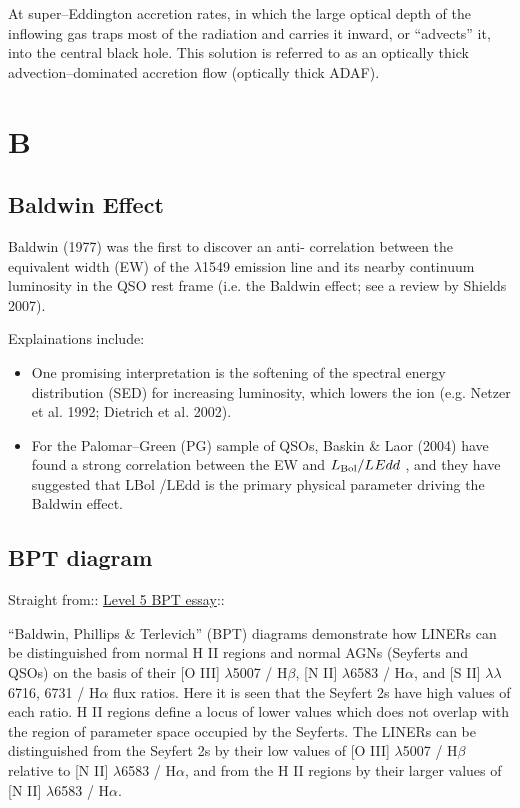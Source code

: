 \documentclass[11pt]{article}
\begin{document}
At super–Eddington accretion rates, in which the large optical depth
of the inflowing gas traps most of the radiation and carries it
inward, or “advects” it, into the central black hole. This solution is
referred to as an optically thick advection–dominated accretion flow
(optically thick ADAF).

\section*{B}

\subsection*{Baldwin Effect}
Baldwin (1977) was the first to discover an anti- correlation between the equivalent width (EW) of the \civ $\lambda$1549 emission line and its nearby continuum luminosity in the QSO rest frame (i.e. the Baldwin effect; see a review by Shields 2007). 

Explainations include:
\begin{itemize}

\item One promising interpretation is the softening of the spectral energy distribution (SED) for increasing luminosity, which lowers the ion (e.g. Netzer et al. 1992; Dietrich et al. 2002).

\item For the Palomar–Green (PG) sample of QSOs, Baskin \& Laor (2004) have found a strong correlation between the \civ EW and $L_{\rm Bol} /L_{\rm} Edd$ , and they have suggested that LBol /LEdd is the primary physical parameter driving the Baldwin effect. 

\end{itemize}



\subsection*{BPT diagram}
Straight from:: \href{http://ned.ipac.caltech.edu/level5/Glossary/Essay_bpt.html}{Level 5 BPT essay}::

``Baldwin, Phillips \& Terlevich'' (BPT) diagrams demonstrate how LINERs can be distinguished from normal H II regions and normal AGNs (Seyferts and QSOs) on the basis of their [O III] $\lambda$5007 / H$\beta$, [N II] $\lambda$6583 / H$\alpha$, and [S II] $\lambda \lambda$6716, 6731 / H$\alpha$ flux ratios. Here it is seen that the Seyfert 2s have high values of each ratio. H II regions define a locus of lower values which does not overlap with the region of parameter space occupied by the Seyferts. The LINERs can be distinguished from the Seyfert 2s by their low values of [O III] $\lambda$5007 / H$\beta$ relative to [N II] $\lambda$6583 / H$\alpha$, and from the H II regions by their larger values of [N II] $\lambda$6583 / H$\alpha$. 
\end{document}
